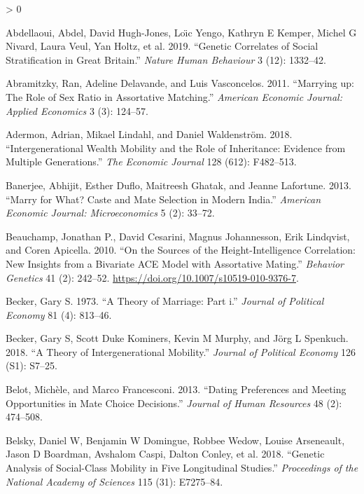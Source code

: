 \documentclass[
]{article}
\newlength{\cslhangindent}
\newenvironment{CSLReferences}[2] %
 {%
  \setlength{\parindent}{0pt}
  \ifodd #1 \everypar{\setlength{\hangindent}{\cslhangindent}}\ignorespaces\fi
  \ifnum #2 > 0
  \setlength{\parskip}{#2\baselineskip}
  \fi
 }%
 {}
\begin{document}
\hypertarget{refs}{}
\begin{CSLReferences}{1}{0}
\leavevmode\hypertarget{ref-abdellaoui2019genetic}{}%
Abdellaoui, Abdel, David Hugh-Jones, Loı̈c Yengo, Kathryn E Kemper, Michel G Nivard, Laura Veul, Yan Holtz, et al. 2019. {``Genetic Correlates of Social Stratification in Great Britain.''} \emph{Nature Human Behaviour} 3 (12): 1332--42.

\leavevmode\hypertarget{ref-abramitzky2011marrying}{}%
Abramitzky, Ran, Adeline Delavande, and Luis Vasconcelos. 2011. {``Marrying up: The Role of Sex Ratio in Assortative Matching.''} \emph{American Economic Journal: Applied Economics} 3 (3): 124--57.

\leavevmode\hypertarget{ref-adermon2018intergenerational}{}%
Adermon, Adrian, Mikael Lindahl, and Daniel Waldenström. 2018. {``Intergenerational Wealth Mobility and the Role of Inheritance: Evidence from Multiple Generations.''} \emph{The Economic Journal} 128 (612): F482--513.

\leavevmode\hypertarget{ref-banerjee2013marry}{}%
Banerjee, Abhijit, Esther Duflo, Maitreesh Ghatak, and Jeanne Lafortune. 2013. {``Marry for What? Caste and Mate Selection in Modern India.''} \emph{American Economic Journal: Microeconomics} 5 (2): 33--72.

\leavevmode\hypertarget{ref-Beauchamp_2010}{}%
Beauchamp, Jonathan P., David Cesarini, Magnus Johannesson, Erik Lindqvist, and Coren Apicella. 2010. {``On the Sources of the Height-Intelligence Correlation: New Insights from a Bivariate {ACE} Model with Assortative Mating.''} \emph{Behavior Genetics} 41 (2): 242--52. \url{https://doi.org/10.1007/s10519-010-9376-7}.

\leavevmode\hypertarget{ref-becker1973theory}{}%
Becker, Gary S. 1973. {``A Theory of Marriage: Part i.''} \emph{Journal of Political Economy} 81 (4): 813--46.

\leavevmode\hypertarget{ref-becker2018theory}{}%
Becker, Gary S, Scott Duke Kominers, Kevin M Murphy, and Jörg L Spenkuch. 2018. {``A Theory of Intergenerational Mobility.''} \emph{Journal of Political Economy} 126 (S1): S7--25.

\leavevmode\hypertarget{ref-belot2013dating}{}%
Belot, Michèle, and Marco Francesconi. 2013. {``Dating Preferences and Meeting Opportunities in Mate Choice Decisions.''} \emph{Journal of Human Resources} 48 (2): 474--508.

\leavevmode\hypertarget{ref-belsky2018genetic}{}%
Belsky, Daniel W, Benjamin W Domingue, Robbee Wedow, Louise Arseneault, Jason D Boardman, Avshalom Caspi, Dalton Conley, et al. 2018. {``Genetic Analysis of Social-Class Mobility in Five Longitudinal Studies.''} \emph{Proceedings of the National Academy of Sciences} 115 (31): E7275--84.


\end{CSLReferences}
\end{document}
